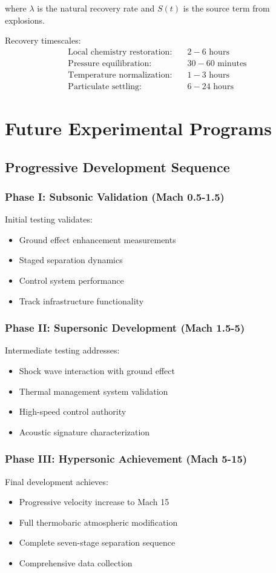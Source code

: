 \documentclass[12pt,a4paper]{article}
\begin{document}
where $\lambda$ is the natural recovery rate and $S(t)$ is the source term from explosions.

Recovery timescales:
\begin{align}
\text{Local chemistry restoration:} &\quad 2-6 \text{ hours} \\
\text{Pressure equilibration:} &\quad 30-60 \text{ minutes} \\
\text{Temperature normalization:} &\quad 1-3 \text{ hours} \\
\text{Particulate settling:} &\quad 6-24 \text{ hours}
\end{align}

\section{Future Experimental Programs}

\subsection{Progressive Development Sequence}

\subsubsection{Phase I: Subsonic Validation (Mach 0.5-1.5)}
Initial testing validates:
\begin{itemize}
\item Ground effect enhancement measurements
\item Staged separation dynamics
\item Control system performance
\item Track infrastructure functionality
\end{itemize}

\subsubsection{Phase II: Supersonic Development (Mach 1.5-5)}
Intermediate testing addresses:
\begin{itemize}
\item Shock wave interaction with ground effect
\item Thermal management system validation
\item High-speed control authority
\item Acoustic signature characterization
\end{itemize}

\subsubsection{Phase III: Hypersonic Achievement (Mach 5-15)}
Final development achieves:
\begin{itemize}
\item Progressive velocity increase to Mach 15
\item Full thermobaric atmospheric modification
\item Complete seven-stage separation sequence
\item Comprehensive data collection
\end{itemize}
\end{document}

